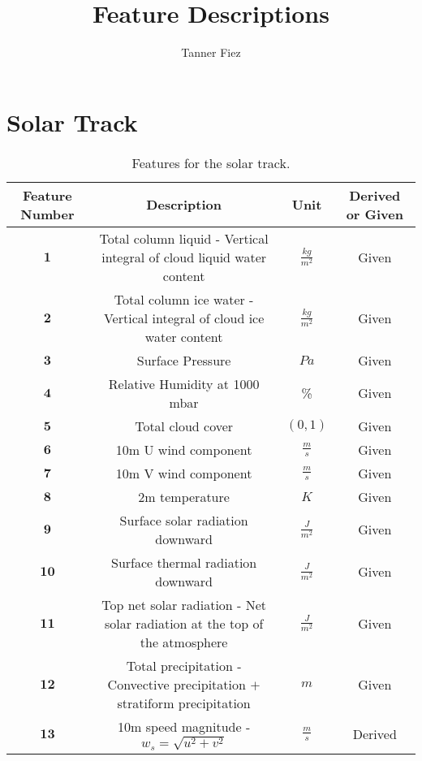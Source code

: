 \documentclass{article}
\begin{document}
\title{Feature Descriptions}
\author{Tanner Fiez}
\date{}
\maketitle

\section{Solar Track}
\begin{table}[H]
  \centering
  \caption{Features for the solar track.}
  \label{}
  \begin{adjustbox}{width=1\textwidth}
  \begin{tabular}{|c|c|c|c|}
    \hline
     Feature Number & Description & Unit & Derived or Given \\
    \hline
    $\textbf{1}$ & Total column liquid - Vertical integral of cloud liquid water content & $\frac{kg}{m^2}$ & Given \\
    \hline
    $\textbf{2}$ & Total column ice water - Vertical integral of cloud ice water content & $\frac{kg}{m^2}$ & Given \\
    \hline
    $\textbf{3}$ & Surface Pressure & $Pa$ & Given \\
    \hline
    $\textbf{4}$ & Relative Humidity at 1000 mbar & \% & Given \\
    \hline
    $\textbf{5}$ & Total cloud cover & $(0,1)$ & Given \\
    \hline
    $\textbf{6}$ & 10m U wind component & $\frac{m}{s}$ & Given \\
    \hline
    $\textbf{7}$ & 10m V wind component & $\frac{m}{s}$ & Given \\
    \hline
    $\textbf{8}$ & 2m temperature & $K$ & Given \\
    \hline
    $\textbf{9}$ & Surface solar radiation downward & $\frac{J}{m^2}$ & Given \\
    \hline
    $\textbf{10}$ & Surface thermal radiation downward & $\frac{J}{m^2}$ & Given \\
    \hline
    $\textbf{11}$ & Top net solar radiation - Net solar radiation at the top of the atmosphere & $\frac{J}{m^2}$ & Given \\
    \hline
    $\textbf{12}$ & Total precipitation - Convective precipitation $+$ stratiform precipitation & $m$ & Given \\
    \hline
    $\textbf{13}$ & 10m speed magnitude - $w_s = \sqrt{u^2 + v^2}$ & $\frac{m}{s}$ & Derived \\
    \hline

\end{tabular}
\end{adjustbox}
\end{table}
\end{document}
